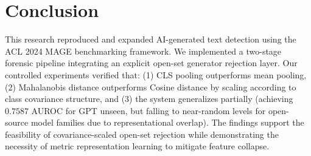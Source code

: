 \documentclass[12pt,a4paper]{report}
\begin{document}
\chapter{Conclusion}
\label{ch:conclusion}

This research reproduced and expanded AI-generated text detection using the ACL 2024 MAGE benchmarking framework. We implemented a two-stage forensic pipeline integrating an explicit open-set generator rejection layer. Our controlled experiments verified that: (1) CLS pooling outperforms mean pooling, (2) Mahalanobis distance outperforms Cosine distance by scaling according to class covariance structure, and (3) the system generalizes partially (achieving $0.7587$ AUROC for GPT unseen, but falling to near-random levels for open-source model families due to representational overlap). The findings support the feasibility of covariance-scaled open-set rejection while demonstrating the necessity of metric representation learning to mitigate feature collapse.

\newpage
{}


\end{document}

